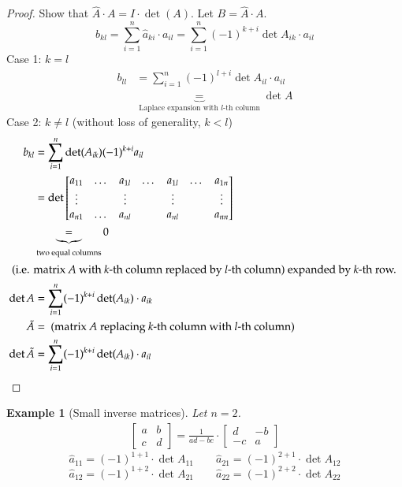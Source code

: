 \documentclass{article}
\newtheorem{example}{Example}  \numberwithin{example}{section}
\begin{document}
\begin{proof}
  Show that $\hat{A} \cdot A = I \cdot \det(A)$.
  Let $B = \hat{A} \cdot A$.
  \[ b_{kl} = \sum_{i=1}^n \hat{a}_{ki} \cdot a_{il} = \sum_{i=1}^n (-1)^{k+i} \det{A_{ik}} \cdot a_{il} \]
  Case 1: $k=l$
  \begin{align*}
    b_{ll} &= \sum_{i=1}^n (-1)^{l+i} \det{A_{il}} \cdot a_{il} \\
           &\underbrace{=}_{\text{Laplace expansion with $l$-th column}} \det{A}
  \end{align*}
  Case 2: $k \neq l$ (without loss of generality, $k < l$)
  \begin{align*}
    b_{kl} &= \sum_{i=1}^n \det(A_{ik}) (-1)^{k+i} a_{il} \\
           &= \det\begin{bmatrix}
             a_{11} & \dots & a_{1l} & \dots & a_{1l} & \dots & a_{1n} \\
             \vdots &       & \vdots &       & \vdots &       & \vdots \\
             a_{n1} & \dots & a_{nl} &       & a_{nl} &       & a_{nn}
           \end{bmatrix} \\
           &\underbrace{=}_{\text{two equal columns}} 0 \\
    \intertext{
      (i.e. matrix $A$ with $k$-th column replaced by $l$-th column)
      expanded by $k$-th row.
    }
    \det{A} &= \sum_{i=1}^n (-1)^{k+i} \det(A_{ik}) \cdot a_{ik} \\
    \tilde{A} &= \text{ (matrix $A$ replacing $k$-th column with $l$-th column)} \\
    \det{\tilde{A}} &= \sum_{i=1}^n (-1)^{k+i} \det(A_{ik}) \cdot a_{il}
  \end{align*}
\end{proof}

\begin{example}[Small inverse matrices] %
  Let $n=2$.
  \begin{align*}
    \begin{bmatrix}
     a & b \\
     c & d
    \end{bmatrix}
    = \frac{1}{ad - bc} \cdot
    \begin{bmatrix} d & -b \\ -c & a \end{bmatrix}
  \end{align*}
  \[ \hat{a}_{11} = (-1)^{1+1} \cdot \det{A_{11}} \qquad \hat{a}_{21} = (-1)^{2+1} \cdot \det{A_{12}} \]
  \[ \hat{a}_{12} = (-1)^{1+2} \cdot \det{A_{21}} \qquad \hat{a}_{22} = (-1)^{2+2} \cdot \det{A_{22}} \]
\end{example}
\end{document}
